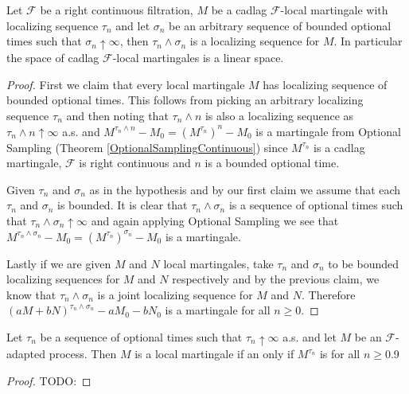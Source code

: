 \begin{lem}Let $\mathcal{F}$ be a right continuous filtration, $M$ be a cadlag $\mathcal{F}$-local martingale with localizing sequence $\tau_n$ and let $\sigma_n$ be an arbitrary sequence of bounded optional times such that $\sigma_n \uparrow \infty$, then $\tau_n \wedge \sigma_n$ is a localizing sequence for $M$.  In particular the space of cadlag $\mathcal{F}$-local martingales is a linear space.
\end{lem}
\begin{proof}
First we claim that every local martingale $M$ has localizing sequence of bounded optional times.  This follows from picking an arbitrary localizing sequence $\tau_n$ and then noting that $\tau_n \wedge n$ is also a localizing sequence as $\tau_n \wedge n \uparrow \infty$ a.s. and $M^{\tau_n \wedge n} -M_0 = (M^{\tau_n})^n - M_0$ is a martingale from Optional Sampling (Theorem \ref{OptionalSamplingContinuous}) since $M^{\tau_n}$ is a cadlag martingale, $\mathcal{F}$ is right continuous and $n$ is a bounded optional time.

Given $\tau_n$ and $\sigma_n$ as in the hypothesis and by our first claim we assume that each $\tau_n$ and $\sigma_n$ is bounded.  It is clear that $\tau_n \wedge \sigma_n$ is a sequence of optional times such that $\tau_n \wedge \sigma_n \uparrow \infty$ and again applying Optional Sampling we see that $M^{\tau_n \wedge \sigma_n} -M_0 = (M^{\tau_n})^{\sigma_n} - M_0$ is a martingale.  

Lastly if we are given $M$ and $N$ local martingales, take $\tau_n$ and $\sigma_n$ to be bounded localizing sequences for $M$ and $N$ respectively and by the previous claim, we know that $\tau_n \wedge \sigma_n$ is a joint localizing sequence for $M$ and $N$.   Therefore $(aM + bN)^{\tau_n \wedge \sigma_n} - a M_0 - b N_0$ is a martingale for all $n \geq 0$.
\end{proof}

\begin{lem}\label{LocalMartingaleLocalProperty}Let $\tau_n$ be a sequence of optional times such that $\tau_n \uparrow \infty$ a.s.  and let $M$ be an $\mathcal{F}$-adapted process.  Then $M$ is a local martingale if an only if $M^{\tau_n}$ is for all $n\geq 0$.9
\end{lem}
\begin{proof}
TODO:
\end{proof}

